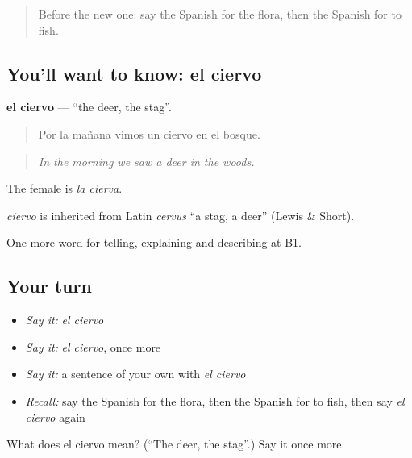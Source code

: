 \label{lesson:ES-C695-ciervo}



\begin{quote}
Before the new one: say the Spanish for the flora, then the Spanish for to fish.
\end{quote}

\subsection*{You'll want to know: el ciervo}
\textbf{el ciervo} — \textquotedblleft{}the deer, the stag\textquotedblright{}.

\begin{quote}
Por la mañana vimos un ciervo en el bosque.
\end{quote}

\begin{quote}
\emph{In the morning we saw a deer in the woods.}
\end{quote}

The female is \emph{la cierva}.

\begin{cousinweb}
\emph{ciervo} is inherited from Latin \emph{cervus} \textquotedblleft{}a stag, a deer\textquotedblright{} (Lewis \& Short).
\end{cousinweb}

\begin{grammarlens}[title={What you've built}]
One more word for telling, explaining and describing at B1.
\end{grammarlens}

\subsection*{Your turn}
\begin{itemize}
\raggedright
  \item \emph{Say it:} \emph{el ciervo}
  \item \emph{Say it:} \emph{el ciervo}, once more
  \item \emph{Say it:} a sentence of your own with \emph{el ciervo}
  \item \emph{Recall:} say the Spanish for the flora, then the Spanish for to fish, then say \emph{el ciervo} again
\end{itemize}

\begin{tcolorbox}[breakable,colback=teal!4,colframe=teal!35!black,title={Before you move on}]
What does el ciervo mean? (\textquotedblleft{}The deer, the stag\textquotedblright{}.) Say it once more.
\end{tcolorbox}
